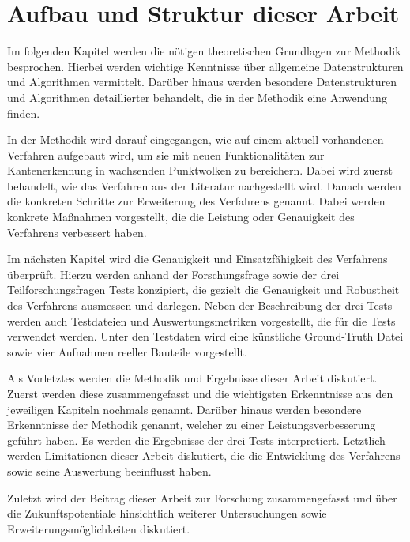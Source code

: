 \section{Aufbau und Struktur dieser Arbeit}
Im folgenden Kapitel werden die nötigen theoretischen Grundlagen zur Methodik besprochen. Hierbei werden wichtige Kenntnisse über allgemeine Datenstrukturen und Algorithmen vermittelt. Darüber hinaus werden besondere Datenstrukturen und Algorithmen detaillierter behandelt, die in der Methodik eine Anwendung finden. 

In der Methodik wird darauf eingegangen, wie auf einem aktuell vorhandenen Verfahren aufgebaut wird, um sie mit neuen Funktionalitäten zur Kantenerkennung in wachsenden Punktwolken zu bereichern. Dabei wird zuerst behandelt, wie das Verfahren aus der Literatur nachgestellt wird. Danach werden die konkreten Schritte zur Erweiterung des Verfahrens genannt. Dabei werden konkrete Maßnahmen vorgestellt, die die Leistung oder Genauigkeit des Verfahrens verbessert haben. 

Im nächsten Kapitel wird die Genauigkeit und Einsatzfähigkeit des Verfahrens überprüft. Hierzu werden anhand der Forschungsfrage sowie der drei Teilforschungsfragen Tests konzipiert, die gezielt die Genauigkeit und Robustheit des Verfahrens ausmessen und darlegen. Neben der Beschreibung der drei Tests werden auch Testdateien und Auswertungsmetriken vorgestellt, die für die Tests verwendet werden. Unter den Testdaten wird eine künstliche Ground-Truth Datei sowie vier Aufnahmen reeller Bauteile vorgestellt. 

Als Vorletztes werden die Methodik und Ergebnisse dieser Arbeit diskutiert. Zuerst werden diese zusammengefasst und die wichtigsten Erkenntnisse aus den jeweiligen Kapiteln nochmals genannt. Darüber hinaus werden besondere Erkenntnisse der Methodik genannt, welcher zu einer Leistungsverbesserung geführt haben. Es werden die Ergebnisse der drei Tests interpretiert. Letztlich werden Limitationen dieser Arbeit diskutiert, die die Entwicklung des Verfahrens sowie seine Auswertung beeinflusst haben. 

Zuletzt wird der Beitrag dieser Arbeit zur Forschung zusammengefasst und über die Zukunftspotentiale hinsichtlich weiterer Untersuchungen sowie Erweiterungsmöglichkeiten diskutiert.